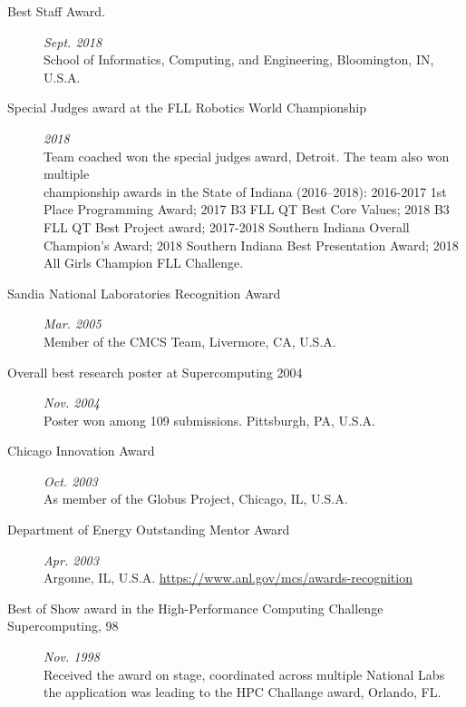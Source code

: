 \documentclass{article}
\begin{document}
\begin{description}
\item[Best Staff Award.] \hfill {\it Sept. 2018} ~\\
  School of Informatics, Computing, and Engineering, Bloomington, IN, U.S.A. 

\item [Special Judges award at the FLL Robotics World Championship] \hfill{\it 2018} ~\\
  Team coached won the special judges award,
  Detroit. The team also won multiple \\
  championship awards in the State of Indiana (2016--2018):
  2016-2017 1st Place Programming Award;
  2017 B3 FLL QT Best Core Values;
  2018 B3 FLL QT Best Project award;  
  2017-2018 Southern Indiana Overall Champion’s Award;
  2018 Southern Indiana Best Presentation Award;
  2018 All Girls Champion FLL Challenge.

  
\item[Sandia National Laboratories Recognition Award]  \hfill {\it Mar. 2005} ~\\
  Member of the CMCS Team, Livermore, CA, U.S.A.
  
\item[Overall best research poster at Supercomputing 2004] \hfill {\it Nov. 2004} ~\\
  Poster won among 109 submissions. Pittsburgh, PA, U.S.A. 
  
\item[Chicago Innovation Award] \hfill {\it Oct. 2003} ~\\
  As member of the Globus Project, Chicago, IL, U.S.A.
  
\item[Department of Energy Outstanding Mentor Award] \hfill {\it Apr. 2003} ~\\
  Argonne, IL, U.S.A. \url{https://www.anl.gov/mcs/awards-recognition}

  
  
\item[Best of Show award in the High-Performance Computing Challenge Supercomputing‚ 98] \hfill {\it Nov. 1998} ~\\
  Received the award on stage, coordinated across multiple National Labs \\
  the application was leading to the HPC Challange award, Orlando, FL.
  

\end{description}
\end{document}
